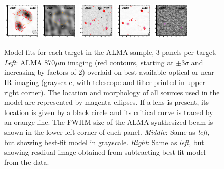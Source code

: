 \documentclass[iop]{emulateapj}
\begin{document}
\begin{figure}[!tbp]
\begin{centering}
\includegraphics[width=0.162\textwidth]{../Figures/modelfit/COS01_model_bestfit.pdf}
\includegraphics[width=0.162\textwidth]{../Figures/modelfit/COS01_residual_bestfit.pdf}
\includegraphics[width=0.162\textwidth]{../Figures/modelfit/COS02_optical_bestfit.pdf}
\includegraphics[width=0.162\textwidth]{../Figures/modelfit/COS02_model_bestfit.pdf}
\includegraphics[width=0.162\textwidth]{../Figures/modelfit/COS02_residual_bestfit.pdf}
\end{centering}

\caption{ Model fits for each target in the ALMA sample, 3 panels per target.
{\it Left}: ALMA 870$\mu$m imaging (red contours, starting at $\pm 3\sigma$ and
increasing by factors of 2) overlaid on best available optical or near-IR
imaging (grayscale, with telescope and filter printed in upper right corner).
The location and morphology of all sources used in the model are represented by
magenta ellipses.  If a lens is present, its location is given by a black
circle and its critical curve is traced by an orange line.  The FWHM size of
the ALMA synthesized beam is shown in the lower left corner of each panel.
{\it Middle}: Same as {\it left}, but showing best-fit model in grayscale.
{\it Right}: Same as {\it left}, but showing resdiual image obtained from
subtracting best-fit model from the data.  \label{fig:uvmodels}}
\addtocounter{figure}{-1}

\end{figure}
\end{document}
